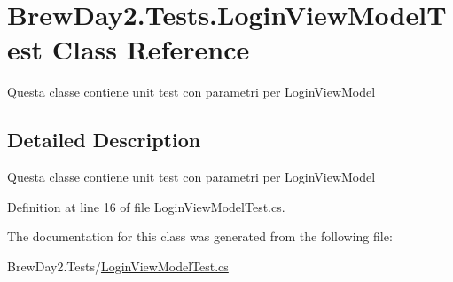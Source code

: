 \hypertarget{class_brew_day2_1_1_tests_1_1_login_view_model_test}{}\section{Brew\+Day2.\+Tests.\+Login\+View\+Model\+Test Class Reference}
\label{class_brew_day2_1_1_tests_1_1_login_view_model_test}


Questa classe contiene unit test con parametri per Login\+View\+Model 




\subsection{Detailed Description}
Questa classe contiene unit test con parametri per Login\+View\+Model



Definition at line 16 of file Login\+View\+Model\+Test.\+cs.



The documentation for this class was generated from the following file\+:\begin{DoxyCompactItemize}
\item 
Brew\+Day2.\+Tests/\mbox{\hyperlink{_login_view_model_test_8cs}{Login\+View\+Model\+Test.\+cs}}\end{DoxyCompactItemize}
